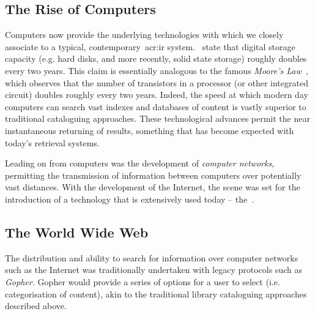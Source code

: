 \subsection{The Rise of Computers}
Computers now provide the underlying technologies with which we closely associate to a typical, contemporary~\gls{acr:ir} system.~\cite{sanderson2012history_of_ir} state that digital storage capacity (e.g. hard disks, and more recently, solid state storage) roughly doubles every two years. This claim is essentially analogous to the famous \emph{Moore's Law}~\citep{moore1965law}, which observes that the number of transistors in a processor (or other integrated circuit) doubles roughly every two years. Indeed, the speed at which modern day computers can search vast indexes and databases of content is vastly superior to traditional cataloguing approaches. These technological advances permit the near instantaneous returning of results, something that has become expected with today's retrieval systems.

Leading on from computers was the development of \emph{computer networks,} permitting the transmission of information between computers over potentially vast distances. With the development of the Internet, the scene was set for the introduction of a technology that is extensively used today -- the~.

\subsection{The World Wide Web}
The distribution and ability to search for information over computer networks such as the Internet was traditionally undertaken with legacy protocols such as \emph{Gopher.} Gopher would provide a series of options for a user to select (i.e. categorisation of content), akin to the traditional library cataloguing approaches described above.

